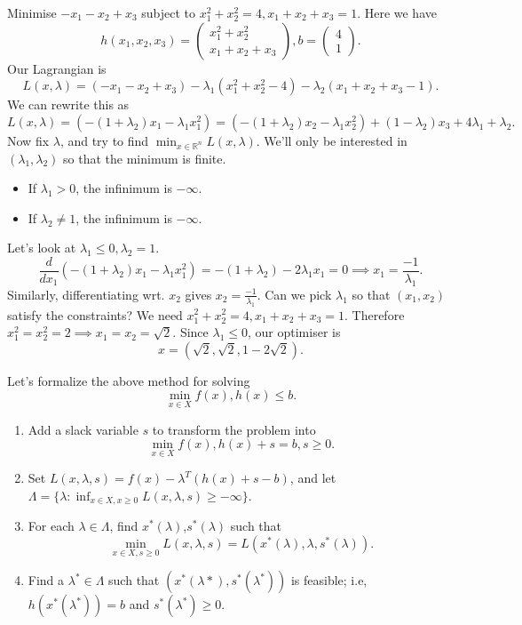 \documentclass[a4paper]{scrartcl}
\begin{document}
\begin{example}
	Minimise $-x_1-x_2 +x_3 $ subject to $x_1^2+x_2^2=4, x_1 +x_2 +x_3 =1$. Here we have 
	\[h(x_1,x_2,x_3)=\begin{pmatrix}
	x_1^2+x_2^2 \\x_1 +x_2 +x_3
	\end{pmatrix}
	,b=\begin{pmatrix}
	4\\1
	\end{pmatrix}
	 .\]
	Our Lagrangian is 
	\[L(x,\lambda)=(-x_1-x_2+x_3)-\lambda_1(x_1^2+x_2^2-4)-\lambda_2(x_1 +x_2 +x_3 -1).\]
	We can rewrite this as 
	\[L(x,\lambda)=(-(1+\lambda_2)x_1-\lambda_1 x_1^2)= (-(1+\lambda_2)x_2-\lambda_1 x_2^2)+(1-\lambda_2)x_3 + 4\lambda_1+\lambda_2.\]
	Now fix $\lambda$, and try to find $\min_{x \in \mathbb{R}^{n} }L(x,\lambda)$. We'll only be interested in $(\lambda_1,\lambda_2)$ so that the minimum is finite.
	\begin{itemize}
		\item If $\lambda_1>0$, the infinimum is $-\infty$.
		\item If $\lambda_2\neq 1$, the infinimum is $-\infty$.
	\end{itemize}
	Let's look at $\lambda_1\leq 0, \lambda_2=1$.
	\[\frac{d}{dx_1}(-(1+\lambda_2)x_1-\lambda_1 x_1^2)=-(1+\lambda_2)-2\lambda_1 x_1=0 \implies x_1=\frac{-1}{\lambda_1}.\]
	Similarly, differentiating wrt. $x_2$ gives $x_2=\frac{-1}{\lambda_1}$. Can we pick $\lambda_1$ so that $(x_1,x_2)$ satisfy the constraints? We need 
	$x_1^2+x_2^2=4, x_1 +x_2 +x_3 =1$. Therefore $x_1^2=x_2^2=2 \implies x_1=x_2=\sqrt{2}$. Since $\lambda_1 \leq 0$, our optimiser is 
	\[x=(\sqrt{2},\sqrt{2},1-2 \sqrt{2}).\]
\end{example}

Let's formalize the above method for solving 
\[\min_{x \in X} f(x), h (x)\leq b.\]
\begin{enumerate}
	\item Add a slack variable $s$ to transform the problem into
	\[\min_{x \in X} f(x), h (x)+s=b, s \geq 0.\]
	\item Set $L (x,\lambda,s)=f(x)-\lambda^T (h(x)+s-b)$, and let $\Lambda=\{\lambda: \inf_{x \in X, x \geq 0} L(x,\lambda,s)\geq -\infty\}$.
	\item For each $\lambda \in \Lambda$, find $x^*(\lambda)$,$s^*(\lambda)$ such that 
	\[\min_{x \in X, s \geq 0}L(x,\lambda,s)=L(x^*(\lambda),\lambda,s^*(\lambda)).\]
	\item Find a $\lambda^* \in \Lambda$ such that $(x^* (\lambda*), s^* (\lambda^*))$ is feasible; i.e, $h (x^* (\lambda^*))=b$ and $s^* (\lambda^*)\geq 0$.
\end{enumerate}
\end{document}
